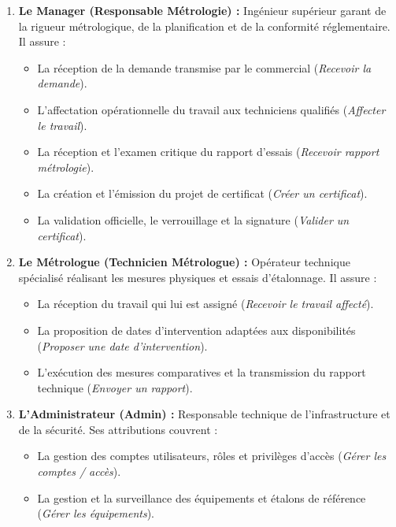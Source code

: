 \documentclass{bts-report}
\begin{document}
\begin{enumerate}
\begin{itemize}
    \end{itemize}
  \item \textbf{Le Manager (Responsable M\'etrologie) :} Ing\'enieur sup\'erieur garant de la rigueur m\'etrologique, de la planification et de la conformit\'e r\'eglementaire. Il assure :
    \begin{itemize}
      \item La r\'eception de la demande transmise par le commercial (\textit{Recevoir la demande}).
      \item L'affectation op\'erationnelle du travail aux techniciens qualifi\'es (\textit{Affecter le travail}).
      \item La r\'eception et l'examen critique du rapport d'essais (\textit{Recevoir rapport m\'etrologie}).
      \item La cr\'eation et l'\'emission du projet de certificat (\textit{Cr\'eer un certificat}).
      \item La validation officielle, le verrouillage et la signature (\textit{Valider un certificat}).
    \end{itemize}
  \item \textbf{Le M\'etrologue (Technicien M\'etrologue) :} Op\'erateur technique sp\'ecialis\'e r\'ealisant les mesures physiques et essais d'\'etalonnage. Il assure :
    \begin{itemize}
      \item La r\'eception du travail qui lui est assign\'e (\textit{Recevoir le travail affect\'e}).
      \item La proposition de dates d'intervention adapt\'ees aux disponibilit\'es (\textit{Proposer une date d'intervention}).
      \item L'ex\'ecution des mesures comparatives et la transmission du rapport technique (\textit{Envoyer un rapport}).
    \end{itemize}
  \item \textbf{L'Administrateur (Admin) :} Responsable technique de l'infrastructure et de la s\'ecurit\'e. Ses attributions couvrent :
    \begin{itemize}
      \item La gestion des comptes utilisateurs, r\^oles et privil\`eges d'acc\`es (\textit{G\'erer les comptes / acc\`es}).
      \item La gestion et la surveillance des \'equipements et \'etalons de r\'ef\'erence (\textit{G\'erer les \'equipements}).
    \end{itemize}
\end{enumerate}
\end{document}
